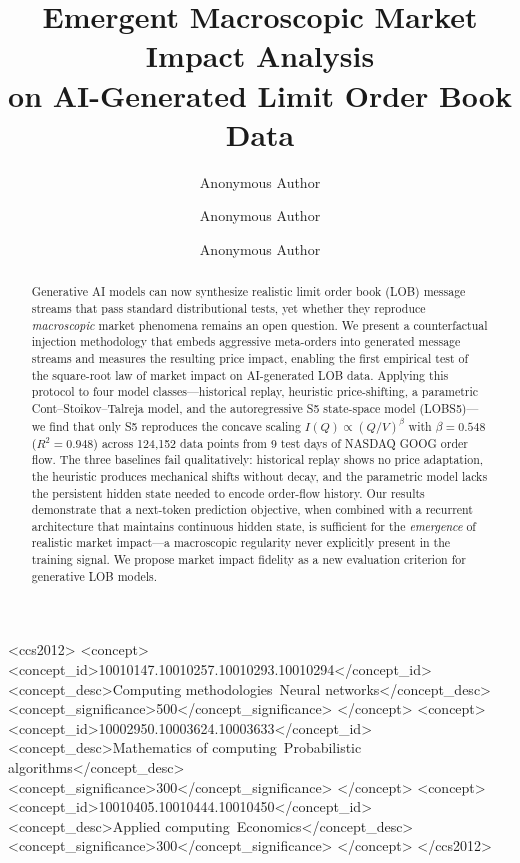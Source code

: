\documentclass[sigplan,screen,anonymous]{acmart}
\begin{document}
\title{Emergent Macroscopic Market Impact Analysis \\ on AI-Generated Limit Order Book Data}

\author{Anonymous Author}

\author{Anonymous Author}

\author{Anonymous Author}

\renewcommand{\shortauthors}{Anonymous et al.}

\begin{abstract}
Generative AI models can now synthesize realistic limit order book (LOB) message streams that pass standard distributional tests, yet whether they reproduce \emph{macroscopic} market phenomena remains an open question. We present a counterfactual injection methodology that embeds aggressive meta-orders into generated message streams and measures the resulting price impact, enabling the first empirical test of the square-root law of market impact on AI-generated LOB data. Applying this protocol to four model classes---historical replay, heuristic price-shifting, a parametric Cont--Stoikov--Talreja model, and the autoregressive S5 state-space model (LOBS5)---we find that only S5 reproduces the concave scaling $I(Q) \propto (Q/V)^{\beta}$ with $\beta = 0.548$ ($R^2 = 0.948$) across 124{,}152 data points from 9 test days of NASDAQ GOOG order flow. The three baselines fail qualitatively: historical replay shows no price adaptation, the heuristic produces mechanical shifts without decay, and the parametric model lacks the persistent hidden state needed to encode order-flow history. Our results demonstrate that a next-token prediction objective, when combined with a recurrent architecture that maintains continuous hidden state, is sufficient for the \emph{emergence} of realistic market impact---a macroscopic regularity never explicitly present in the training signal. We propose market impact fidelity as a new evaluation criterion for generative LOB models.
\end{abstract}

\begin{CCSXML}
<ccs2012>
 <concept>
  <concept_id>10010147.10010257.10010293.10010294</concept_id>
  <concept_desc>Computing methodologies~Neural networks</concept_desc>
  <concept_significance>500</concept_significance>
 </concept>
 <concept>
  <concept_id>10002950.10003624.10003633</concept_id>
  <concept_desc>Mathematics of computing~Probabilistic algorithms</concept_desc>
  <concept_significance>300</concept_significance>
 </concept>
 <concept>
  <concept_id>10010405.10010444.10010450</concept_id>
  <concept_desc>Applied computing~Economics</concept_desc>
  <concept_significance>300</concept_significance>
 </concept>
</ccs2012>
\end{CCSXML}
\end{document}
